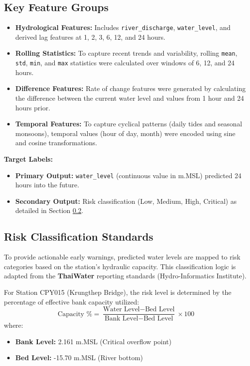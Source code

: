 \subsection{Key Feature Groups}
\begin{itemize}
    \item \textbf{Hydrological Features:}
    Includes \texttt{river\_discharge}, \texttt{water\_level}, and derived lag features at 1, 2, 3, 6, 12, and 24 hours.

    \item \textbf{Rolling Statistics:}
    To capture recent trends and variability, rolling \texttt{mean}, \texttt{std}, \texttt{min}, and \texttt{max} statistics were calculated over windows of 6, 12, and 24 hours.

    \item \textbf{Difference Features:}
    Rate of change features were generated by calculating the difference between the current water level and values from 1 hour and 24 hours prior.

    \item \textbf{Temporal Features:}
    To capture cyclical patterns (daily tides and seasonal monsoons), temporal values (hour of day, month) were encoded using sine and cosine transformations.
\end{itemize}

\textbf{Target Labels:}
\begin{itemize}
    \item \textbf{Primary Output:} \texttt{water\_level} (continuous value in m.MSL) predicted 24 hours into the future.
    \item \textbf{Secondary Output:} Risk classification (Low, Medium, High, Critical) as detailed in Section \ref{sec:risk_standards}.
\end{itemize}

\subsection{Risk Classification Standards}
\label{sec:risk_standards}
To provide actionable early warnings, predicted water levels are mapped to risk categories based on the station's hydraulic capacity. This classification logic is adapted from the \textbf{ThaiWater} reporting standards (Hydro-Informatics Institute)\cite{thaiwater_wl}.

For Station CPY015 (Krungthep Bridge), the risk level is determined by the percentage of effective bank capacity utilized:
\begin{equation}
    \text{Capacity \%} = \frac{\text{Water Level} - \text{Bed Level}}{\text{Bank Level} - \text{Bed Level}} \times 100
\end{equation}
where:
\begin{itemize}
    \item \textbf{Bank Level:} 2.161 m.MSL (Critical overflow point)
    \item \textbf{Bed Level:} -15.70 m.MSL (River bottom)
\end{itemize}

